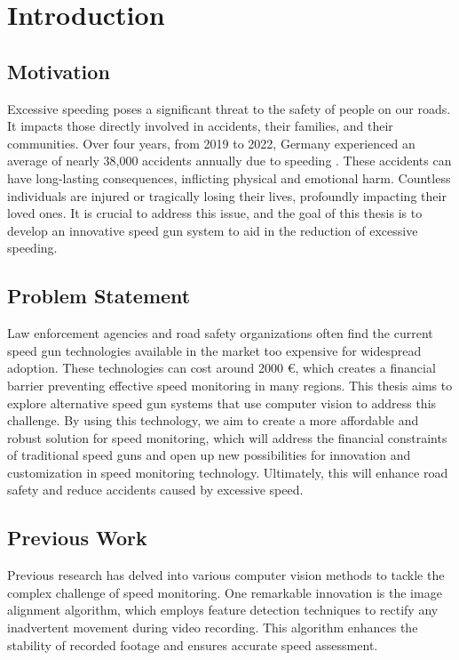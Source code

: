 \chapter{Introduction}

\section{Motivation}

Excessive speeding poses a significant threat to the safety of people on our roads. It impacts those directly involved in accidents, their families, and their communities. Over four years, from 2019 to 2022, Germany experienced an average of nearly 38,000 accidents annually due to speeding \cite{Statis_2023b}. These accidents can have long-lasting consequences, inflicting physical and emotional harm. Countless individuals are injured or tragically losing their lives, profoundly impacting their loved ones. It is crucial to address this issue, and the goal of this thesis is to develop an innovative speed gun system to aid in the reduction of excessive speeding.

\section{Problem Statement}
Law enforcement agencies and road safety organizations often find the current speed gun technologies available in the market too expensive for widespread adoption. These technologies can cost around 2000 €, which creates a financial barrier preventing effective speed monitoring in many regions. This thesis aims to explore alternative speed gun systems that use computer vision to address this challenge. By using this technology, we aim to create a more affordable and robust solution for speed monitoring, which will address the financial constraints of traditional speed guns and open up new possibilities for innovation and customization in speed monitoring technology. Ultimately, this will enhance road safety and reduce accidents caused by excessive speed.

\section{Previous Work}
Previous research \cite{Sabtu_2023} has delved into various computer vision methods to tackle the complex challenge of speed monitoring. One remarkable innovation is the image alignment algorithm, which employs feature detection techniques to rectify any inadvertent movement during video recording. This algorithm enhances the stability of recorded footage and ensures accurate speed assessment.

